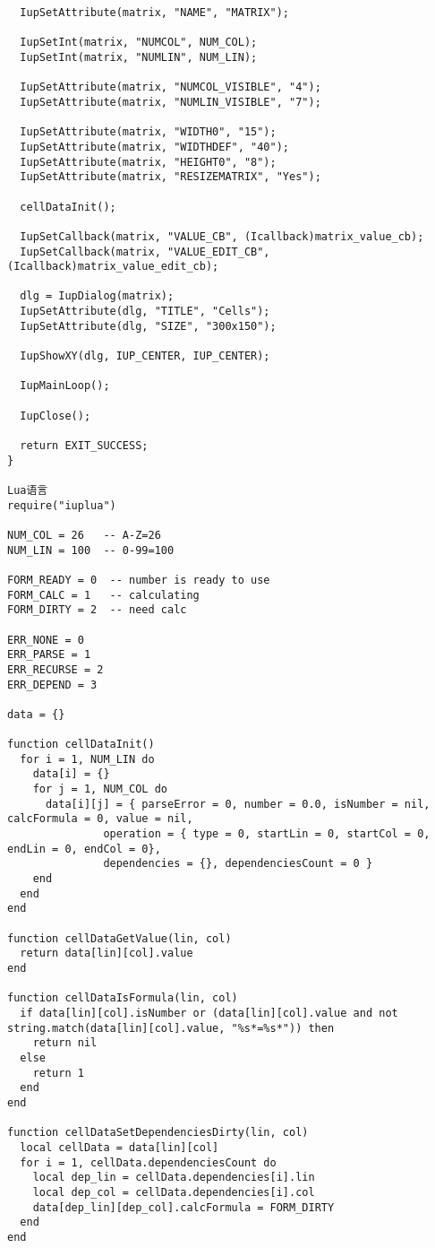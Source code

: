 \documentclass{ctexart}
\begin{document}
\begin{lstlisting}
  IupSetAttribute(matrix, "NAME", "MATRIX");

  IupSetInt(matrix, "NUMCOL", NUM_COL);
  IupSetInt(matrix, "NUMLIN", NUM_LIN);

  IupSetAttribute(matrix, "NUMCOL_VISIBLE", "4");
  IupSetAttribute(matrix, "NUMLIN_VISIBLE", "7");

  IupSetAttribute(matrix, "WIDTH0", "15");
  IupSetAttribute(matrix, "WIDTHDEF", "40");
  IupSetAttribute(matrix, "HEIGHT0", "8");
  IupSetAttribute(matrix, "RESIZEMATRIX", "Yes");

  cellDataInit();

  IupSetCallback(matrix, "VALUE_CB", (Icallback)matrix_value_cb);
  IupSetCallback(matrix, "VALUE_EDIT_CB", (Icallback)matrix_value_edit_cb);

  dlg = IupDialog(matrix);
  IupSetAttribute(dlg, "TITLE", "Cells");
  IupSetAttribute(dlg, "SIZE", "300x150");

  IupShowXY(dlg, IUP_CENTER, IUP_CENTER);

  IupMainLoop();

  IupClose();

  return EXIT_SUCCESS;
}

Lua语言
require("iuplua")

NUM_COL = 26   -- A-Z=26
NUM_LIN = 100  -- 0-99=100

FORM_READY = 0  -- number is ready to use
FORM_CALC = 1   -- calculating
FORM_DIRTY = 2  -- need calc

ERR_NONE = 0
ERR_PARSE = 1
ERR_RECURSE = 2
ERR_DEPEND = 3

data = {}

function cellDataInit()
  for i = 1, NUM_LIN do
    data[i] = {}
    for j = 1, NUM_COL do
      data[i][j] = { parseError = 0, number = 0.0, isNumber = nil, calcFormula = 0, value = nil,
               operation = { type = 0, startLin = 0, startCol = 0, endLin = 0, endCol = 0},
               dependencies = {}, dependenciesCount = 0 }
    end
  end
end

function cellDataGetValue(lin, col)
  return data[lin][col].value
end

function cellDataIsFormula(lin, col)
  if data[lin][col].isNumber or (data[lin][col].value and not string.match(data[lin][col].value, "%s*=%s*")) then
    return nil
  else
    return 1
  end
end

function cellDataSetDependenciesDirty(lin, col)
  local cellData = data[lin][col]
  for i = 1, cellData.dependenciesCount do
    local dep_lin = cellData.dependencies[i].lin
    local dep_col = cellData.dependencies[i].col
    data[dep_lin][dep_col].calcFormula = FORM_DIRTY
  end
end


\end{lstlisting}
\end{document}
